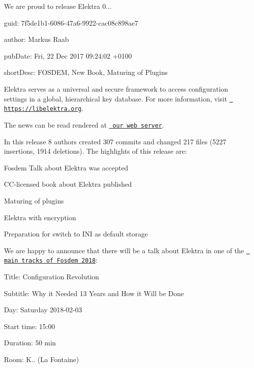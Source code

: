 We are proud to release Elektra 0...


\begin{DoxyItemize}
\item guid\+: 7f5de1b1-\/6086-\/47a6-\/9922-\/cac08c898ae7
\item author\+: Markus Raab
\item pub\+Date\+: Fri, 22 Dec 2017 09\+:24\+:02 +0100
\item short\+Desc\+: F\+O\+S\+D\+EM, New Book, Maturing of Plugins
\end{DoxyItemize}

Elektra serves as a universal and secure framework to access configuration settings in a global, hierarchical key database. For more information, visit \href{https://libelektra.org}{\texttt{ https\+://libelektra.\+org}}.

The news can be read rendered at \href{https://www.libelektra.org/news/0.8.21-release}{\texttt{ our web server}}.

In this release 8 authors created 307 commits and changed 217 files (5227 insertions, 1914 deletions). The highlights of this release are\+:


\begin{DoxyItemize}
\item Fosdem Talk about Elektra was accepted
\item C\+C-\/licensed book about Elektra published
\item Maturing of plugins
\item Elektra with encryption
\item Preparation for switch to I\+NI as default storage
\end{DoxyItemize}

We are happy to announce that there will be a talk about Elektra in one of the \href{https://fosdem.org/2018/schedule/event/elektra/}{\texttt{ main tracks of Fosdem 2018}}\+:


\begin{DoxyItemize}
\item Title\+: Configuration Revolution
\item Subtitle\+: Why it Needed 13 Years and How it Will be Done
\item Day\+: Saturday 2018-\/02-\/03
\item Start time\+: 15\+:00
\item Duration\+: 50 min
\item Room\+: K.. (La Fontaine)
\end{DoxyItemize}

